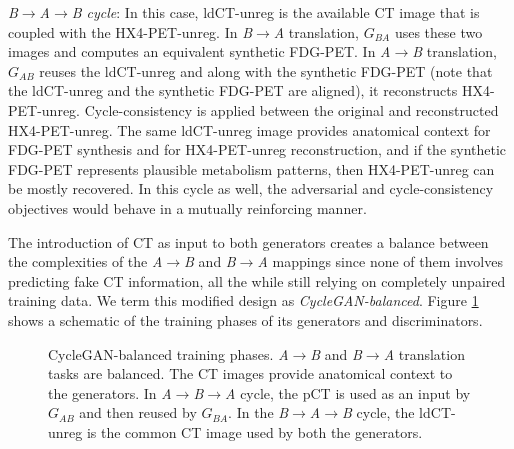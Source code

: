 \vspace{4mm}
\noindent
\textit{B$\rightarrow$A$\rightarrow$B cycle}: In this case, ldCT-unreg is the available CT image that is coupled with the HX4-PET-unreg. In \textit{B}$\rightarrow$\textit{A} translation, $G_{BA}$ uses these two images and computes an equivalent synthetic FDG-PET. In \textit{A}$\rightarrow$\textit{B} translation, $G_{AB}$ reuses the ldCT-unreg and along with the synthetic FDG-PET (note that the ldCT-unreg and the synthetic FDG-PET are aligned), it reconstructs HX4-PET-unreg. Cycle-consistency is applied between the original and reconstructed HX4-PET-unreg. The same ldCT-unreg image provides anatomical context for FDG-PET synthesis and for HX4-PET-unreg reconstruction, and if the synthetic FDG-PET represents plausible metabolism patterns, then HX4-PET-unreg can be mostly recovered. In this cycle as well, the adversarial and cycle-consistency objectives would behave in a mutually reinforcing manner.

\vspace{4mm}
The introduction of CT as input to both generators creates a balance between the complexities of the \textit{A}$\rightarrow$\textit{B} and \textit{B}$\rightarrow$\textit{A} mappings since none of them involves predicting fake CT information, all the while still relying on completely unpaired training data. We term this modified design as \textit{CycleGAN-balanced}. Figure \ref{fig:cyclegan_balanced} shows a schematic of the training phases of its generators and discriminators.

\begin{figure}[h!]
    \centering
    \caption{CycleGAN-balanced training phases. \textit{A}$\rightarrow$\textit{B} and \textit{B}$\rightarrow$\textit{A} translation tasks are balanced. The CT images provide anatomical context to the generators. In \textit{A}$\rightarrow$\textit{B}$\rightarrow$\textit{A} cycle, the pCT is used as an input by $G_{AB}$ and then reused by $G_{BA}$. In the \textit{B}$\rightarrow$\textit{A}$\rightarrow$\textit{B} cycle, the ldCT-unreg is the common CT image used by both the generators.}
    \label{fig:cyclegan_balanced}
\end{figure}{}

